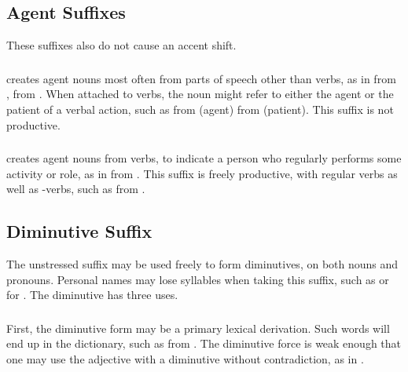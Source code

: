 \subsection{Agent Suffixes} These suffixes also do not cause an accent
shift.

\subsubsection{} 
 creates agent nouns most often from parts of speech other than
verbs, as in  
from  ,   from  .  When
attached to verbs, the noun might refer to either the agent or the
patient of a verbal action, such as  
from   (agent)  
from   (patient).  This suffix is not
productive.

\subsubsection{}  creates agent nouns from verbs, to indicate a
person who regularly performs some activity or role, as in
  from  .  This suffix is freely
productive, with regular verbs as well as -verbs, such
as   from  .


\subsection{Diminutive Suffix} The unstressed suffix  may be
used freely to form diminutives, on both nouns and pronouns.  Personal
names may lose syllables when taking this suffix, such as  or
 for .  The diminutive has three uses.
\label{lingop:dimin}

\subsubsection{} First, the diminutive form may be a primary lexical
derivation.  Such words will end up in the dictionary, such as
  from  .  The
diminutive force is weak enough that one may use the adjective
  with a diminutive without contradiction, as in
 .

